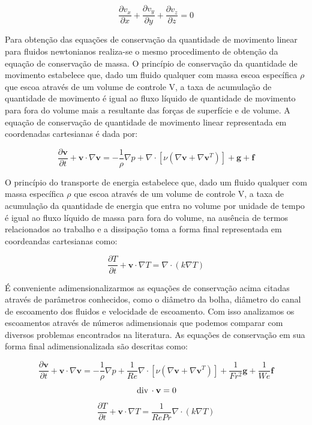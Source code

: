 \documentclass[a4paper,portuges]{article}
\newcommand{\diverg}{{\,\rm div}\,}
\newcommand{\vvet}{\mathbf{v}}
\begin{document}
\begin{equation}
	\frac{\partial v_x}{\partial x} +
	\frac{\partial v_y}{\partial y} +
	\frac{\partial v_z}{\partial z}  
	= 
	0
	\label{eq:cm9}
\end{equation}

Para obtenção das equações de conservação da quantidade de movimento
linear para fluidos newtonianos realiza-se o mesmo procedimento de
obtenção da equação de conservação de massa. O princípio de conservação
da quantidade de movimento estabelece que, dado um fluido qualquer com
massa escoa específica $\rho$ que escoa através de um volume de controle
V, a taxa de acumulação de quantidade de movimento é igual ao fluxo
líquido de quantidade de movimento para fora do volume mais a resultante
das forças de superfície e de volume. A equação de conservação de
quantidade de movimento linear representada em coordenadas cartesianas é
dada por:

\begin{equation}
	\frac{\partial \vvet}{\partial t} + \vvet \cdot \nabla \vvet
	= 
	- \frac{1}{\rho} \nabla p +
	\nabla \cdot [\nu(\nabla \vvet + \nabla \vvet^T)] + 
	\textbf{g} + 
	\textbf{f}
\label{eq:NS3a}
\end{equation}

O princípio do transporte de energia estabelece que, dado um
fluido qualquer com massa específica $\rho$ que escoa através de um
volume de controle V, a taxa de acumulação da quantidade de energia
que entra no volume por unidade de tempo é igual ao fluxo
líquido de massa para fora do volume, na ausência de termos relacionados
ao trabalho e a dissipação toma a forma final representada em
coordeandas cartesianas como:

\begin{equation}
	\frac{\partial T}{\partial t} + \vvet \cdot \nabla T
	=  
	\nabla \cdot (k \nabla T)
\label{eq:quimica2}
\end{equation}\vspace{0.5cm}

É conveniente adimensionalizarmos as equações de conservação acima
citadas através de parâmetros conhecidos, como o diâmetro da bolha,
diâmetro do canal de escoamento dos fluidos e velocidade de escoamento.
Com isso analizamos os escoamentos através de números adimensionais que
podemos comparar com diversos problemas encontrados na literatura. As
equações de conservação em sua forma final adimensionalizada são
descritas como:

\begin{equation}
	\frac{\partial \vvet}{\partial t} + \vvet \cdot \nabla \vvet
	=
	-\frac{1}{\rho} \nabla p + \frac{1}{Re} \nabla \cdot
	[\nu ( \nabla \vvet + \nabla \vvet^T)]+
	\frac{1}{Fr^2} \mathbf{g} + 
	\frac{1}{We} \mathbf{f}
	\label{eq:final1}
\end{equation}
\begin{equation}
	\diverg \cdot \vvet = 0
	\label{eq:final2} 
\end{equation}	
\begin{equation}
	\frac{\partial T}{\partial t} + \vvet \cdot \nabla T
	=
	\frac{1}{RePr} \nabla \cdot (k \nabla T)
	\label{eq:final3}
\end{equation}\vspace{0.5cm}
\end{document}
